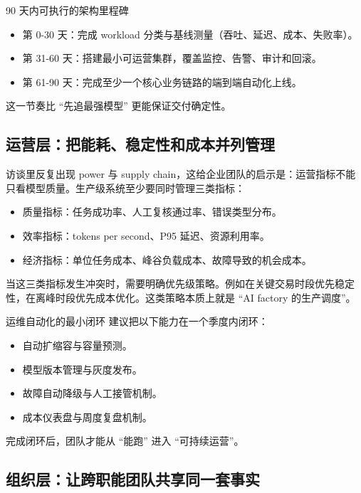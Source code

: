 \documentclass[a4paper]{article}
\begin{document}
\begin{importantbox}{90 天内可执行的架构里程碑}
\begin{itemize}
    \item 第 0-30 天：完成 workload 分类与基线测量（吞吐、延迟、成本、失败率）。
    \item 第 31-60 天：搭建最小可运营集群，覆盖监控、告警、审计和回滚。
    \item 第 61-90 天：完成至少一个核心业务链路的端到端自动化上线。
\end{itemize}
这一节奏比 ``先追最强模型'' 更能保证交付确定性。
\end{importantbox}

\subsection{运营层：把能耗、稳定性和成本并列管理}

访谈里反复出现 power 与 supply chain，这给企业团队的启示是：运营指标不能只看模型质量。生产级系统至少要同时管理三类指标：
\begin{itemize}
    \item 质量指标：任务成功率、人工复核通过率、错误类型分布。
    \item 效率指标：tokens per second、P95 延迟、资源利用率。
    \item 经济指标：单位任务成本、峰谷负载成本、故障导致的机会成本。
\end{itemize}

当这三类指标发生冲突时，需要明确优先级策略。例如在关键交易时段优先稳定性，在离峰时段优先成本优化。这类策略本质上就是 ``AI factory 的生产调度''。

\begin{knowledgebox}{运维自动化的最小闭环}
建议把以下能力在一个季度内闭环：
\begin{itemize}
    \item 自动扩缩容与容量预测。
    \item 模型版本管理与灰度发布。
    \item 故障自动降级与人工接管机制。
    \item 成本仪表盘与周度复盘机制。
\end{itemize}
完成闭环后，团队才能从 ``能跑'' 进入 ``可持续运营''。
\end{knowledgebox}

\subsection{组织层：让跨职能团队共享同一套事实}
\end{document}
